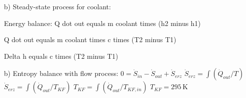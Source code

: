 b) Steady-state process for coolant:  

Energy balance:  
Q dot out equals m coolant times (h2 minus h1)  

Q dot out equals m coolant times c times (T2 minus T1)  

Delta h equals c times (T2 minus T1)

b) Entropy balance with flow process:  
\( 0 = \dot{S}_{in} - \dot{S}_{out} + \dot{S}_{erz} \)  
\( \dot{S}_{erz} = \int (\dot{Q}_{out}/T) \)  
\( \dot{S}_{erz} = \int (\dot{Q}_{out}/T_{KF}) \)  
\( T_{KF} = \int (\dot{Q}_{out}/T_{KF,in}) \)  
\( T_{KF} = 295 \, \text{K} \)